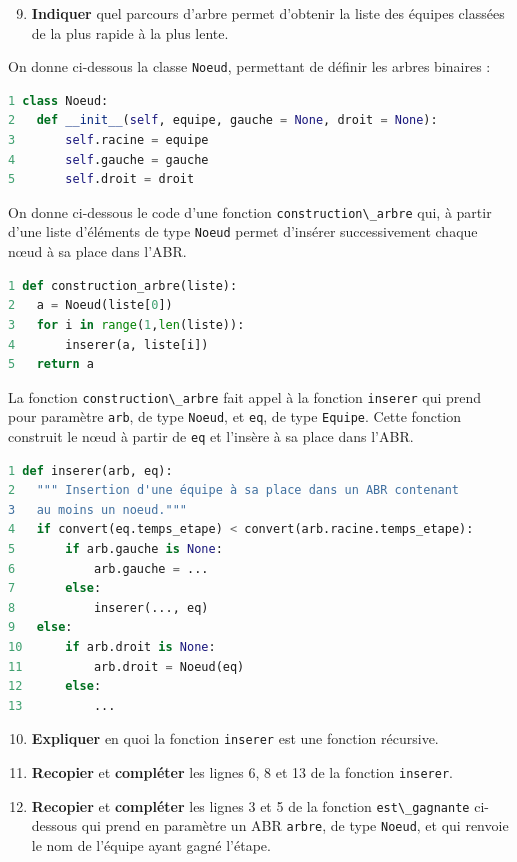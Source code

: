 \begin{enumerate}
\setcounter{enumi}{8}
\item
  \textbf{Indiquer} quel parcours d'arbre permet d'obtenir la liste des
  équipes classées de la plus rapide à la plus lente.
\end{enumerate}

On donne ci-dessous la classe \passthrough{\lstinline!Noeud!},
permettant de définir les arbres binaires :

\begin{lstlisting}[language=Python]
1 class Noeud:
2   def __init__(self, equipe, gauche = None, droit = None):
3       self.racine = equipe
4       self.gauche = gauche
5       self.droit = droit
\end{lstlisting}

On donne ci-dessous le code d'une fonction
\passthrough{\lstinline!construction\_arbre!} qui, à partir d'une liste
d'éléments de type \passthrough{\lstinline!Noeud!} permet d'insérer
successivement chaque nœud à sa place dans l'ABR.

\begin{lstlisting}[language=Python]
1 def construction_arbre(liste):
2   a = Noeud(liste[0])
3   for i in range(1,len(liste)):
4       inserer(a, liste[i])
5   return a
\end{lstlisting}

La fonction \passthrough{\lstinline!construction\_arbre!} fait appel à
la fonction \passthrough{\lstinline!inserer!} qui prend pour paramètre
\passthrough{\lstinline!arb!}, de type \passthrough{\lstinline!Noeud!},
et \passthrough{\lstinline!eq!}, de type
\passthrough{\lstinline!Equipe!}. Cette fonction construit le nœud à
partir de \passthrough{\lstinline!eq!} et l'insère à sa place dans
l'ABR.

\begin{lstlisting}[language=Python]
1 def inserer(arb, eq):
2   """ Insertion d'une équipe à sa place dans un ABR contenant
3   au moins un noeud."""
4   if convert(eq.temps_etape) < convert(arb.racine.temps_etape):
5       if arb.gauche is None:
6           arb.gauche = ...
7       else:
8           inserer(..., eq)
9   else:
10      if arb.droit is None:
11          arb.droit = Noeud(eq)
12      else:
13          ...
\end{lstlisting}

\begin{enumerate}
\setcounter{enumi}{9}
\item
  \textbf{Expliquer} en quoi la fonction
  \passthrough{\lstinline!inserer!} est une fonction récursive.
\item
  \textbf{Recopier} et \textbf{compléter} les lignes 6, 8 et 13 de la
  fonction \passthrough{\lstinline!inserer!}.
\item
  \textbf{Recopier} et \textbf{compléter} les lignes 3 et 5 de la
  fonction \passthrough{\lstinline!est\_gagnante!} ci-dessous qui prend
  en paramètre un ABR \passthrough{\lstinline!arbre!}, de type
  \passthrough{\lstinline!Noeud!}, et qui renvoie le nom de l'équipe
  ayant gagné l'étape.
\end{enumerate}

